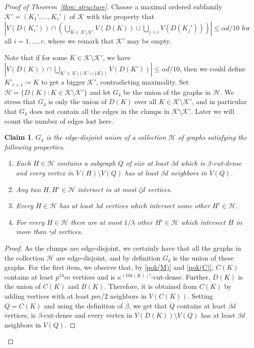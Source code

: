 \documentclass[10pt]{article}
\newtheorem{claim}[theorem]{Claim}
\theoremstyle{definition}
\let\leq\leqslant
\begin{document}
\begin{proof}[Proof of Theorem~\ref{thm: structure}]
Choose a maximal ordered subfamily $\mathcal K'=(K_1', \dots, K_r')$ of $\mathcal K$ with the property that $|V(D(K_i'))\cap (\bigcup_{K\in\mathcal K\setminus  \mathcal K'}V(D(K)) \cup \bigcup_{j>i} V(D(K_j')))|\leq \alpha d/10$ for all $i=1, \dots, r$, where we remark that $\mathcal K'$ may be empty. 

 Note that if for some $K\in \mathcal K\setminus \mathcal K'$, we have $|V(D(K))\cap \bigcup_{K'\in \mathcal K\setminus (\mathcal K'\cup \{K\})} V(D(K'))|\leq \alpha d/10$, then we could  define $K'_{r+1}\coloneqq K$ to get a bigger $\mathcal K'$, contradicting maximality. Set $\mathcal H = \{D(K) : K\in\mathcal K\setminus \mathcal K'\}$ and let $G_4$ be the union of the graphs in $\mathcal H$. We stress that $G_4$ is only the union of $D(K)$ over all $K \in \mathcal K \setminus \mathcal K'$, and in particular that $G_4$ does not contain all the edges in the clumps in $\mathcal K\setminus \mathcal K'$. Later we will count the number of edges lost here.

\begin{claim}\label{claim:G3 good}
    $G_4$ is the edge-disjoint union of a collection $\mathcal H$ of graphs satisfying the following properties.
        \begin{enumerate}
            \item Each $H\in\mathcal H$ contains a subgraph $Q$ of size at least $\beta d$ which is $\beta$-cut-dense and every vertex in $V(H)\setminus V(Q)$ has at least $\beta d$ neighbors in $V(Q)$.
            \item Any two $H,H'\in\mathcal H$ intersect in at most $\zeta d$ vertices.
            \item Every $H\in \mathcal H$ has at least $\lambda d$ vertices which intersect some other $H'\in\mathcal H$.
            \item For every $H\in\mathcal H$ there are at most $1/\lambda$ other $H'\in\mathcal H$ which intersect $H$ in more than $\gamma d$ vertices.
    \end{enumerate}
\end{claim}

\begin{proof}
As the clumps are edge-disjoint, we certainly have that all the graphs in the collection $\mathcal H$ are edge-disjoint, and by definition $G_4$ is the union of these graphs. For the first item, we observe that, by \ref{pok(M)} and \ref{pok(C)}, $C(K)$ contains at least $p^{13}m$ vertices and is $\kappa^{(10k(K))!}$-cut-dense. Further, $D(K)$ is the union of $C(K)$ and $B(K)$. Therefore, it is obtained from $C(K)$ by adding vertices with at least $pm/2$ neighbors in $V(C(K))$. Setting $Q=C(K)$ and using the definition of $\beta$, we get that $Q$ contains at least $\beta d$ vertices, is $\beta$-cut-dense and every vertex in $V(D(K))\setminus V(Q)$ has at least $\beta d$ neighbors in $V(Q)$.


\end{proof}
\end{proof}
\end{document}

